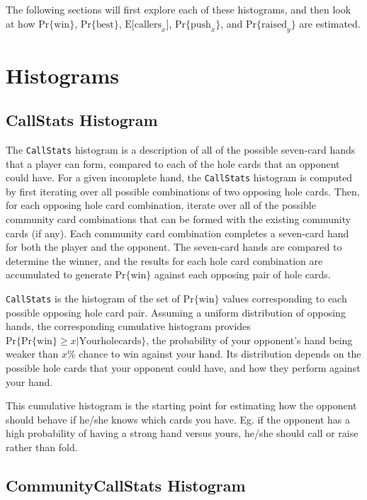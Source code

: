 The following sections will first explore each of these histograms, and then look at how $\mathrm{Pr\{win\}}$, $\mathrm{Pr\{best\}}$, $\mathrm{E[callers}_x]$, $\mathrm{Pr\{push}_x\}$, and $\mathrm{Pr\{raised}_y\}$ are estimated.

\section{Histograms}

\subsection{CallStats Histogram}
\label{sec:CallStats}

The \texttt{CallStats} histogram is a description of all of the possible seven-card hands that a player can form, compared to each of the hole cards that an opponent could have.
For a given incomplete hand, the \texttt{CallStats} histogram is computed by first iterating over all possible combinations of two opposing hole cards.
Then, for each opposing hole card combination, iterate over all of the possible community card combinations that can be formed with the existing community cards (if any).
Each community card combination completes a seven-card hand for both the player and the opponent.
The seven-card hands are compared to determine the winner, and the results for each hole card combination are accumulated to generate $\mathrm{Pr\{win\}}$ against each opposing pair of hole cards.

\texttt{CallStats} is the histogram of the set of $\mathrm{Pr\{win\}}$ values corresponding to each possible opposing hole card pair.
Assuming a uniform distribution of opposing hands, the corresponding cumulative histogram provides $\mathrm{Pr}\{\mathrm{Pr\{win\}} \ge x|\mathrm{Your hole cards}\}$, the probability of your opponent's hand being weaker than $x$\% chance to win against your hand.
Its distribution depends on the possible hole cards that your opponent could have, and how they perform against your hand.

This cumulative histogram is the starting point for estimating how the opponent should behave if he/she knows which cards you have.
Eg. if the opponent has a high probability of having a strong hand versus yours, he/she should call or raise rather than fold.


\subsection{CommunityCallStats Histogram}
\label{sec:CommunityCallStats}

